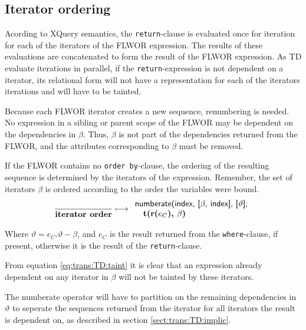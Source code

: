 \subsection{Iterator ordering}
\label{sect:trans:TD:flwor:itOrd}
Acording to XQuery semantics, the \texttt{return}-clause is evaluated once for
iteration for each of the iterators of the FLWOR expression. The results of these evaluations are concatenated to form the result of the FLWOR
expression. As TD evaluate iterations in parallel, if the \texttt{return}-expression is not dependent on a
iterator, its relational form will not have a representation for each of the iterators iterations and will have to be tainted.

Because each FLWOR iterator creates a new sequence, renumbering is needed. No expression in a sibling or parent
scope of the FLWOR may be dependent on the dependencies in $\beta$. Thus, $\beta$ is not part of the dependencies
returned from the FLWOR, and the attributes corresponding to $\beta$ must be removed. 

If the FLWOR contains no \texttt{order by}-clause, the ordering of the resulting sequence is determined by the
iterators of the expression. Remember, the set of iterators $\beta$ is ordered according to the order the
variables were bound.
\begin{equation}
\frac{}{\mbox{\textbf{iterator order}}}
\longmapsto
\begin{array}{l}
\mbox{\textsf{numberate(index, [}}\beta\mbox{\textsf{, index], [}}\vartheta\mbox{\textsf{];}} \\ \quad
\mbox{\textbf{t(r(}}e_{C}\mbox{\textbf{), }}\beta\mbox{\textbf{)}}
\end{array}
\label{rule:trans:TD:itOrd}
\end{equation}

Where $\vartheta = e_{C}.\vartheta - \beta$, and $e_C$ is the result returned from the \texttt{where}-clause, if
present, otherwise it is the result of the \texttt{return}-clause.

From equation \ref{eq:trans:TD:taint} it is clear that an expression already dependent on any iterator in $\beta$
will not be tainted by these iterators.

The \textsf{numberate} operator will have to partition on the remaining dependencies in $\vartheta$ to seperate
the sequences returned from the iterator for all iterators the result is dependent on, as described in section
\ref{sect:trans:TD:implic}.

